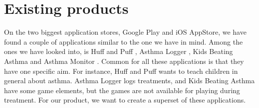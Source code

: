 \section{Existing products}
\label{sec:exisiting-products}

On the two biggest application stores, Google Play and iOS AppStore, we have found a couple of applications similar to the one we have in mind. Among the ones we have looked into, is Huff and Puff , Asthma Logger
, Kids Beating Asthma  and Asthma Monitor . Common for all these applications is that they have one specific aim. For instance, Huff and Puff wants to teach children in general about asthma. Asthma Logger logs treatments, and Kids Beating Asthma have some game elements, but the games are not available for playing during treatment. For our product, we want to create a superset of these applications. 

